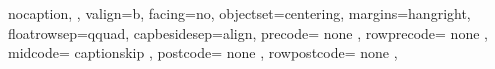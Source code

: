 {{{       nocaption, %
   },%
   valign=b, %
   facing=no, %
   objectset=centering,    %
    margins=hangright, %
    floatrowsep=qquad, 
   capbesidesep=align, 
   precode={
      none %
   },%
   rowprecode={
      none %
   },%
   midcode={%
      captionskip
   },%
   postcode={%
      none %
   },%
   rowpostcode={%
      none %
   },%
}}
